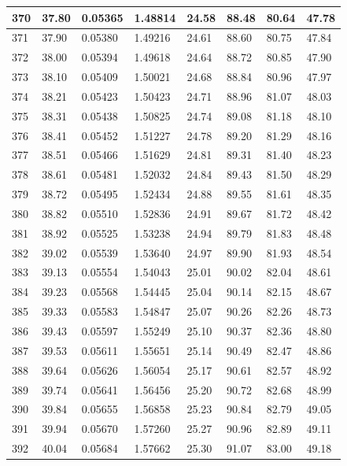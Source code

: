 \documentclass[12pt,a4paper,twoside]{article}
\begin{document}
\begin{center}
\begin{longtable}{l l l l | l l l l}
370 & 37.80 & 0.05365 & 1.48814 & 24.58 & 88.48 & 80.64 & 47.78 \\ \hline
371 & 37.90 & 0.05380 & 1.49216 & 24.61 & 88.60 & 80.75 & 47.84 \\ \hline
372 & 38.00 & 0.05394 & 1.49618 & 24.64 & 88.72 & 80.85 & 47.90 \\ \hline
373 & 38.10 & 0.05409 & 1.50021 & 24.68 & 88.84 & 80.96 & 47.97 \\ \hline
374 & 38.21 & 0.05423 & 1.50423 & 24.71 & 88.96 & 81.07 & 48.03 \\ \hline
375 & 38.31 & 0.05438 & 1.50825 & 24.74 & 89.08 & 81.18 & 48.10 \\ \hline
376 & 38.41 & 0.05452 & 1.51227 & 24.78 & 89.20 & 81.29 & 48.16 \\ \hline
377 & 38.51 & 0.05466 & 1.51629 & 24.81 & 89.31 & 81.40 & 48.23 \\ \hline
378 & 38.61 & 0.05481 & 1.52032 & 24.84 & 89.43 & 81.50 & 48.29 \\ \hline
379 & 38.72 & 0.05495 & 1.52434 & 24.88 & 89.55 & 81.61 & 48.35 \\ \hline
380 & 38.82 & 0.05510 & 1.52836 & 24.91 & 89.67 & 81.72 & 48.42 \\ \hline
381 & 38.92 & 0.05525 & 1.53238 & 24.94 & 89.79 & 81.83 & 48.48 \\ \hline
382 & 39.02 & 0.05539 & 1.53640 & 24.97 & 89.90 & 81.93 & 48.54 \\ \hline
383 & 39.13 & 0.05554 & 1.54043 & 25.01 & 90.02 & 82.04 & 48.61 \\ \hline
384 & 39.23 & 0.05568 & 1.54445 & 25.04 & 90.14 & 82.15 & 48.67 \\ \hline
385 & 39.33 & 0.05583 & 1.54847 & 25.07 & 90.26 & 82.26 & 48.73 \\ \hline
386 & 39.43 & 0.05597 & 1.55249 & 25.10 & 90.37 & 82.36 & 48.80 \\ \hline
387 & 39.53 & 0.05611 & 1.55651 & 25.14 & 90.49 & 82.47 & 48.86 \\ \hline
388 & 39.64 & 0.05626 & 1.56054 & 25.17 & 90.61 & 82.57 & 48.92 \\ \hline
389 & 39.74 & 0.05641 & 1.56456 & 25.20 & 90.72 & 82.68 & 48.99 \\ \hline
390 & 39.84 & 0.05655 & 1.56858 & 25.23 & 90.84 & 82.79 & 49.05 \\ \hline
391 & 39.94 & 0.05670 & 1.57260 & 25.27 & 90.96 & 82.89 & 49.11 \\ \hline
392 & 40.04 & 0.05684 & 1.57662 & 25.30 & 91.07 & 83.00 & 49.18 \\ \hline

\end{longtable}
\end{center}
\end{document}
